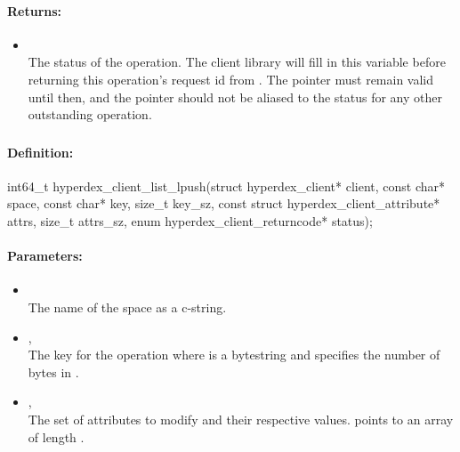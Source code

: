 \paragraph{Returns:}
\begin{itemize}[noitemsep]
\item {}\\
The status of the operation.  The client library will fill in this variable before returning this operation's request id from .  The pointer must remain valid until then, and the pointer should not be aliased to the status for any other outstanding operation.
\end{itemize}

\pagebreak
\subsubsection{}
\label{api:c:list_lpush}


\paragraph{Definition:}
\begin{ccode}
int64_t hyperdex_client_list_lpush(struct hyperdex_client* client,
        const char* space,
        const char* key, size_t key_sz,
        const struct hyperdex_client_attribute* attrs, size_t attrs_sz,
        enum hyperdex_client_returncode* status);
\end{ccode}

\paragraph{Parameters:}
\begin{itemize}[noitemsep]
\item {}\\
The name of the space as a c-string.
\item {}, \\
The key for the operation where  is a bytestring and  specifies the number of bytes in .
\item {}, \\
The set of attributes to modify and their respective values.   points to an array of length .
\end{itemize}


